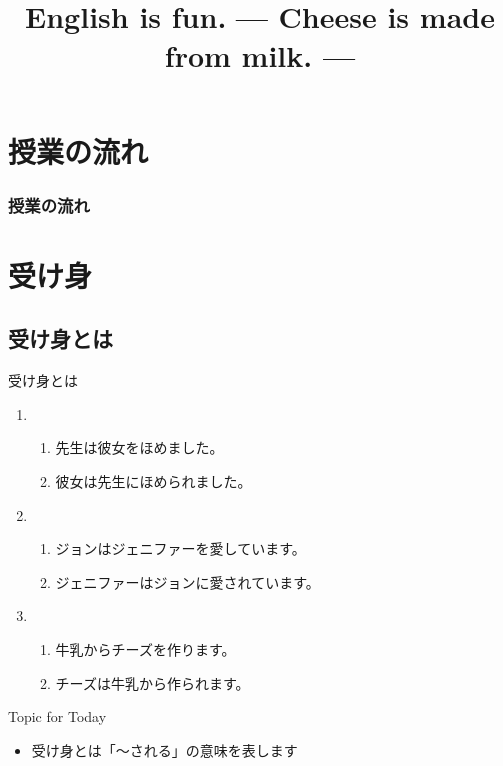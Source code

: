 \documentclass[aspectratio=169,xcolor={dvipsnames,table}]{beamer}
\title{English is fun.\,\,{}--- Cheese is made from milk. ---}
\author{}
\institute[]{}
\date[]
\begin{document}
\begin{frame}[plain]
  \titlepage
\end{frame}

\section*{授業の流れ}
\begin{frame}[plain]
  \frametitle{授業の流れ}
  \tableofcontents
\end{frame}

\section{受け身}

\subsection{受け身とは}

\begin{frame}[plain]{受け身とは}
 \Large

\begin{enumerate}
 \item \begin{enumerate}
	\item 先生は彼女をほめました。
	\item 彼女は先生にほめられました。
       \end{enumerate}
 \item \begin{enumerate}
	\item ジョンはジェニファーを愛しています。
	\item ジェニファーはジョンに愛されています。
       \end{enumerate}
 \item \begin{enumerate}
	\item 牛乳からチーズを作ります。
	\item チーズは牛乳から作られます。
       \end{enumerate}
\end{enumerate}

\begin{exampleblock}{Topic for Today}
\pause
\begin{itemize}\small
 \item 受け身とは「〜される」の意味を表します
\end{itemize}
     \end{exampleblock}

\end{frame}
\end{document}
